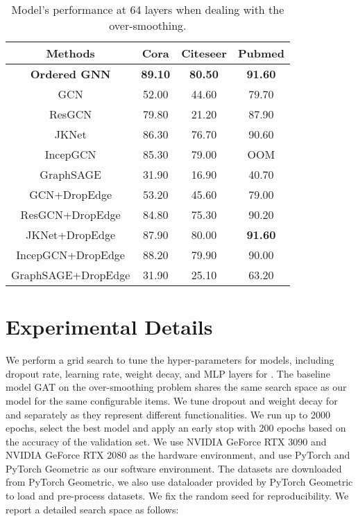\documentclass{article}
\begin{document}
\begin{table}
\caption{Model's performance at 64 layers when dealing with the over-smoothing.}
\label{table.64layers}
\centering
\begin{tabular}{c|ccc}

\toprule
Methods & Cora & Citeseer & Pubmed \\
\midrule
\textbf{Ordered GNN} & \textbf{89.10} & \textbf{80.50} & \textbf{91.60} \\
\midrule
GCN & 52.00 & 44.60 & 79.70 \\
ResGCN & 79.80 & 21.20 & 87.90 \\
JKNet & 86.30 & 76.70 & 90.60 \\
IncepGCN & 85.30 & 79.00 & OOM \\
GraphSAGE & 31.90 & 16.90 & 40.70 \\
\midrule
GCN+DropEdge & 53.20 & 45.60 & 79.00 \\
ResGCN+DropEdge & 84.80 & 75.30 & 90.20 \\
JKNet+DropEdge & 87.90 & 80.00 & \textbf{91.60} \\
IncepGCN+DropEdge & 88.20 & 79.90 & 90.00 \\
GraphSAGE+DropEdge & 31.90 & 25.10 & 63.20 \\
\bottomrule

\end{tabular}
\end{table}


\section{Experimental Details}
\label{exp_detail}

We perform a grid search to tune the hyper-parameters for models, including dropout rate, learning rate, weight decay, and MLP layers for . The baseline model GAT on the over-smoothing problem shares the same search space as our model for the same configurable items. We tune dropout and weight decay for  and  separately as they represent different functionalities. We run up to 2000 epochs, select the best model and apply an early stop with 200 epochs based on the accuracy of the validation set. We use NVIDIA GeForce RTX 3090 and NVIDIA GeForce RTX 2080 as the hardware environment, and use PyTorch and PyTorch Geometric as our software environment. The datasets are downloaded from PyTorch Geometric, we also use dataloader provided by PyTorch Geometric to load and pre-process datasets. We fix the random seed for reproducibility. We report a detailed search space as follows:
\end{document}
